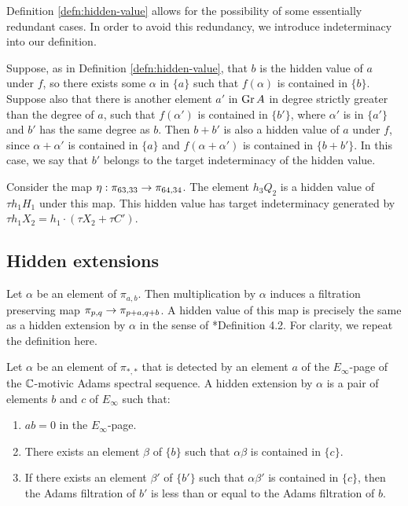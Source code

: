 Definition \ref{defn:hidden-value} allows for the possibility of
some essentially redundant cases.  In order to avoid this redundancy,
we introduce indeterminacy into our definition.

Suppose, as in Definition \ref{defn:hidden-value},
that $b$ is the hidden value of $a$ under $f$, so
there exists some $\alpha$ in $\{a\}$ such that
$f(\alpha)$ is contained in $\{b\}$.
Suppose also that there is another element $a'$ in $\operatorname{Gr} A$ 
in degree strictly greater than the degree of $a$, such that
$f(\alpha')$ is contained in $\{b'\}$, where
$\alpha'$ is in $\{a'\}$ and $b'$ has the same degree as $b$.
Then $b+b'$ is also a hidden value of $a$ under $f$, since
$\alpha + \alpha'$ is contained in $\{a\}$ and
$f(\alpha + \alpha')$ is contained in $\{b+b'\}$.
In this case, we say that $b'$ belongs to the target
indeterminacy of the hidden value.

\begin{ex}
Consider the map $\eta: \pi_{63,33} \rightarrow \pi_{64,34}$.
The element $h_3 Q_2$ is a hidden value of $\tau h_1 H_1$
under this map.
This hidden value has target indeterminacy generated by 
$\tau h_1 X_2 = h_1 \cdot (\tau X_2 + \tau C')$.
\end{ex}


\subsection{Hidden extensions}

Let $\alpha$ be an element of $\pi_{a,b}$.  Then
multiplication by $\alpha$ induces a filtration preserving map
$\pi_{p,q} \rightarrow \pi_{p+a,q+b}$.
A hidden value of this map is precisely the same as a hidden
extension by $\alpha$ in the sense of \cite{Isaksen14c}*{Definition 4.2}.
For clarity, we repeat the definition here.

\begin{defn}
\label{defn:hidden}
Let $\alpha$ be an element of $\pi_{*,*}$ that is detected
by an element $a$ of the $E_\infty$-page of the $\mathbb{C}$-motivic Adams spectral sequence.
A hidden extension by $\alpha$ is a pair
of elements $b$ and $c$ of $E_\infty$ such that:
\begin{enumerate}
\item
$a b = 0$ in the $E_\infty$-page.
\item
There exists an element $\beta$ of $\{ b \}$ 
such that $\alpha \beta$ is contained in $\{ c \}$.
\item
If there exists an element $\beta'$ of $\{b'\}$ such
that $\alpha \beta'$ is contained in $\{ c\}$, then
the Adams filtration of $b'$ is less than or equal to the
Adams filtration of $b$.
\end{enumerate}
\end{defn}

